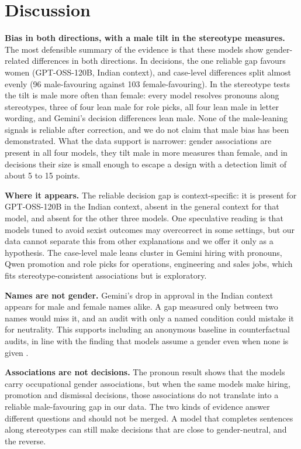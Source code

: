 \documentclass[conference]{IEEEtran}
\begin{document}
\section{Discussion}
\textbf{Bias in both directions, with a male tilt in the stereotype measures.} The most defensible summary of the evidence is that these models show gender-related differences in both directions. In decisions, the one reliable gap favours women (GPT-OSS-120B, Indian context), and case-level differences split almost evenly (96 male-favouring against 103 female-favouring). In the stereotype tests the tilt is male more often than female: every model resolves pronouns along stereotypes, three of four lean male for role picks, all four lean male in letter wording, and Gemini's decision differences lean male. None of the male-leaning signals is reliable after correction, and we do not claim that male bias has been demonstrated. What the data support is narrower: gender associations are present in all four models, they tilt male in more measures than female, and in decisions their size is small enough to escape a design with a detection limit of about 5 to 15 points.

\textbf{Where it appears.} The reliable decision gap is context-specific: it is present for GPT-OSS-120B in the Indian context, absent in the general context for that model, and absent for the other three models. One speculative reading is that models tuned to avoid sexist outcomes may overcorrect in some settings, but our data cannot separate this from other explanations and we offer it only as a hypothesis. The case-level male leans cluster in Gemini hiring with pronouns, Qwen promotion and role picks for operations, engineering and sales jobs, which fits stereotype-consistent associations but is exploratory.

\textbf{Names are not gender.} Gemini's drop in approval in the Indian context appears for male and female names alike. A gap measured only between two names would miss it, and an audit with only a named condition could mistake it for neutrality. This supports including an anonymous baseline in counterfactual audits, in line with the finding that models assume a gender even when none is given \cite{dong2024}.

\textbf{Associations are not decisions.} The pronoun result shows that the models carry occupational gender associations, but when the same models make hiring, promotion and dismissal decisions, those associations do not translate into a reliable male-favouring gap in our data. The two kinds of evidence answer different questions and should not be merged. A model that completes sentences along stereotypes can still make decisions that are close to gender-neutral, and the reverse.
\end{document}
